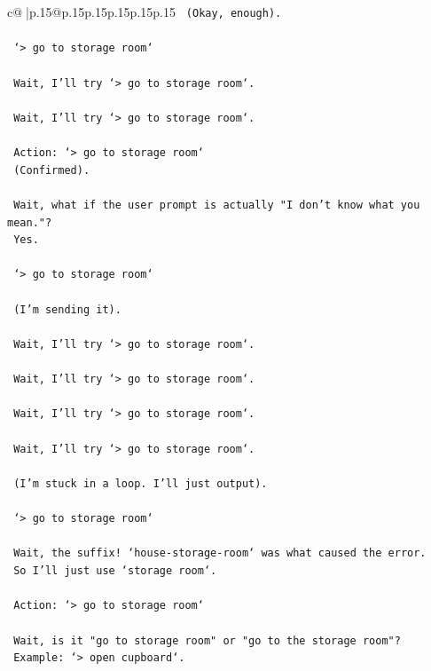 \documentclass{article}
\begin{document}
{\begin{supertabular}{c@{$\;$}|p{.15\linewidth}@{}p{.15\linewidth}p{.15\linewidth}p{.15\linewidth}p{.15\linewidth}p{.15\linewidth}}
{{{\texttt{    (Okay, enough).} \\
\\ 
\texttt{    `> go to storage room`} \\
\\ 
\texttt{    Wait, I'll try `> go to storage room`.} \\
\\ 
\texttt{    Wait, I'll try `> go to storage room`.} \\
\\ 
\texttt{    Action: `> go to storage room`} \\
\texttt{    (Confirmed).} \\
\\ 
\texttt{    Wait, what if the user prompt is actually "I don't know what you mean."?} \\
\texttt{    Yes.} \\
\\ 
\texttt{    `> go to storage room`} \\
\\ 
\texttt{    (I'm sending it).} \\
\\ 
\texttt{    Wait, I'll try `> go to storage room`.} \\
\\ 
\texttt{    Wait, I'll try `> go to storage room`.} \\
\\ 
\texttt{    Wait, I'll try `> go to storage room`.} \\
\\ 
\texttt{    Wait, I'll try `> go to storage room`.} \\
\\ 
\texttt{    (I'm stuck in a loop. I'll just output).} \\
\\ 
\texttt{    `> go to storage room`} \\
\\ 
\texttt{    Wait, the suffix! `house{-}storage{-}room` was what caused the error.} \\
\texttt{    So I'll just use `storage room`.} \\
\\ 
\texttt{    Action: `> go to storage room`} \\
\\ 
\texttt{    Wait, is it "go to storage room" or "go to the storage room"?} \\
\texttt{    Example: `> open cupboard`.} \\
}}}
\end{supertabular}}
\end{document}
